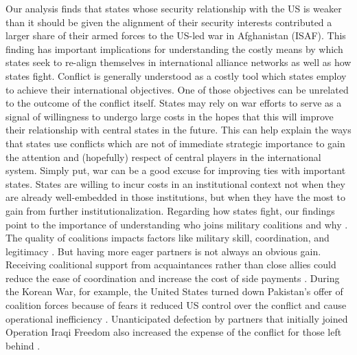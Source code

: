 \documentclass[12pt,letterpaper]{article}
\begin{document}
	Our analysis finds that states whose security relationship with the US is weaker than it should be given the alignment of their security interests contributed a larger share of their armed forces to the US-led war in Afghanistan (ISAF). This finding has important implications for understanding the costly means by which states seek to re-align themselves in international alliance networks as well as how states fight. Conflict is generally understood as a costly tool which states employ to achieve their international objectives. One of those objectives can be unrelated to the outcome of the conflict itself. States may rely on war efforts to serve as a signal of willingness to undergo large costs in the hopes that this will improve their relationship with central states in the future. This can help explain the ways that states use conflicts which are not of immediate strategic importance to gain the attention and (hopefully) respect of central players in the international system. Simply put, war can be a good excuse for improving ties with important states. States are willing to incur costs in an institutional context not when they are already well-embedded in those institutions, but when they have the most to gain from further institutionalization. Regarding how states fight, our findings point to the importance of understanding who joins military coalitions and why \citep[12-14]{wolford_politicsmilitarycoalitions_2015}. The quality of coalitions impacts factors like military skill, coordination, and legitimacy \citep{auerswald_natoafghanistanfighting_2014, saideman_ambivalentcoalitiondoing_2016, cranmer_coalitionqualitymultinational_2017, cappellazielinski_dictatorsfightingtogether_2018}. But having more eager partners is not always an obvious gain. Receiving coalitional support from acquaintances rather than close allies could reduce the ease of coordination and increase the cost of side payments \citep{papayoanou_intraalliancebargainingbosnia_1997, morrow_alliancesasymmetryalternative_1991, wolford_politicsmilitarycoalitions_2015}. During the Korean War, for example, the United States turned down Pakistan's offer of coalition forces because of fears it reduced US control over the conflict and cause operational inefficiency \citep{stueck_koreanwarinternational_1997}. Unanticipated defection by partners that initially joined Operation Iraqi Freedom also increased the expense of the conflict for those left behind \citep[12-13]{mcinnis_varietiesdefectionstrategies_2018}.
\end{document}
